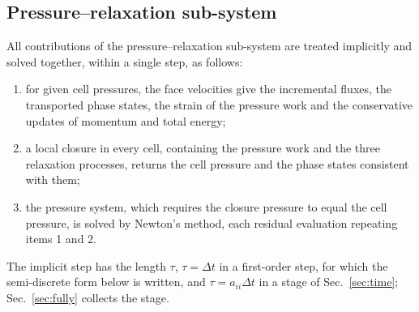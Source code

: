 \subsection{Pressure--relaxation sub-system}
\label{sec:implicit}
All contributions of the pressure--relaxation sub-system are treated implicitly and solved together, within a single step, as follows:
\begin{enumerate}
\item for given cell pressures, the face velocities give the incremental fluxes, the transported phase states, the
strain of the pressure work and the conservative updates of momentum and total energy;
\item a local closure in every cell, containing the pressure work and the three relaxation processes, returns the cell
pressure and the phase states consistent with them;
\item the pressure system, which requires the closure pressure to equal the cell pressure, is solved by Newton's method,
each residual evaluation repeating items 1 and 2.
\end{enumerate}
The implicit step has the length $\tau$, $\tau=\Delta t$ in a first-order step, for which the semi-discrete form below is
written, and $\tau=a_{ii}\Delta t$ in a stage of Sec.~\ref{sec:time}; Sec.~\ref{sec:fully} collects the stage.

